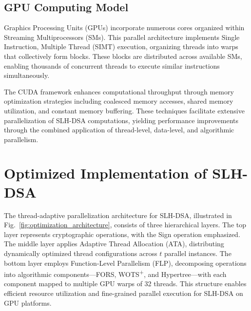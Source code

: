 \documentclass[journal]{IEEEtran}
\begin{document}
\subsection{GPU Computing Model}

Graphics Processing Units (GPUs) incorporate numerous cores organized within Streaming Multiprocessors (SMs). This parallel architecture implements Single Instruction, Multiple Thread (SIMT) execution, organizing threads into warps that collectively form blocks. These blocks are distributed across available SMs, enabling thousands of concurrent threads to execute similar instructions simultaneously.

The CUDA framework enhances computational throughput through memory optimization strategies including coalesced memory accesses, shared memory utilization, and constant memory buffering. These techniques facilitate extensive parallelization of SLH-DSA computations, yielding performance improvements through the combined application of thread-level, data-level, and algorithmic parallelism.

\section{Optimized Implementation of SLH-DSA}\label{sec:implementation}

The thread-adaptive parallelization architecture for SLH-DSA, illustrated in Fig.~\ref{fig:optimization_architecture}, consists of three hierarchical layers. The top layer represents cryptographic operations, with the Sign operation emphasized. The middle layer applies Adaptive Thread Allocation (ATA), distributing dynamically optimized thread configurations across $t$ parallel instances. The bottom layer employs Function-Level Parallelism (FLP), decomposing operations into algorithmic components—FORS, WOTS\textsuperscript{+}, and Hypertree—with each component mapped to multiple GPU warps of 32 threads. This structure enables efficient resource utilization and fine-grained parallel execution for SLH-DSA on GPU platforms.
\end{document}
